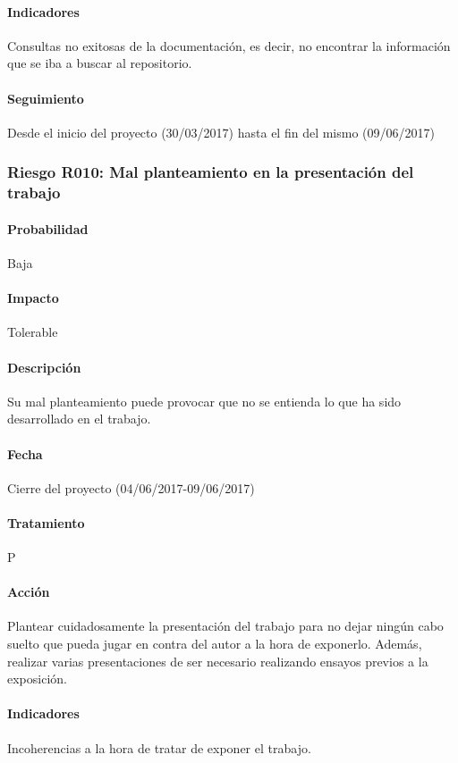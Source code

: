 \documentclass[10pt,a4paper]{article}
\begin{document}
				\paragraph{Indicadores} Consultas no exitosas de la documentación, es decir, no encontrar la información que se iba a buscar al repositorio.
				\paragraph{Seguimiento}	Desde el inicio del proyecto (30/03/2017) hasta el fin del mismo (09/06/2017)
				
				\subsubsection{Riesgo R010: Mal planteamiento en la presentación del trabajo}
				\paragraph{Probabilidad} Baja
				\paragraph{Impacto}	Tolerable
				\paragraph{Descripción} Su mal planteamiento puede provocar que no se entienda lo que ha sido desarrollado en el trabajo. 
				\paragraph{Fecha} Cierre del proyecto (04/06/2017-09/06/2017)
				\paragraph{Tratamiento} P
				\paragraph{Acción} Plantear cuidadosamente la presentación del trabajo para no dejar ningún cabo suelto que pueda jugar en contra del autor a la hora de exponerlo. Además, realizar varias presentaciones de ser necesario realizando ensayos previos a la exposición.
				\paragraph{Indicadores} Incoherencias a la hora de tratar de exponer el trabajo.					
\end{document}
